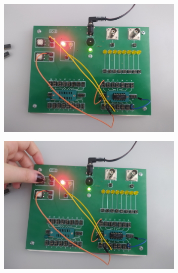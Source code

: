 \begin{itemize}
        \begin{figure}[H]
            \centering
                \begin{subfigure}[h]{0.4\textwidth}
                    \includegraphics[width=\textwidth]{img/NAND/test/1652306732892_scaled.png}
                \end{subfigure}
                \begin{subfigure}[h]{0.4\textwidth}
                    \includegraphics[width=\textwidth]{img/NAND/test/1652306732884_scaled.png}
                \end{subfigure}
                \begin{subfigure}[h]{0.4\textwidth}

\end{subfigure}
\end{figure}
\end{itemize}
